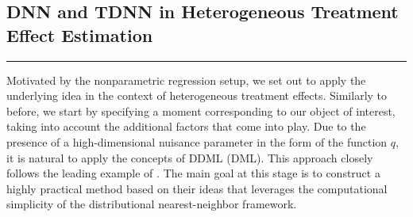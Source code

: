 \subsection{DNN and TDNN in Heterogeneous Treatment Effect Estimation}
\hrule
Motivated by the nonparametric regression setup, we set out to apply the underlying idea in the context of heterogeneous treatment effects.
Similarly to before, we start by specifying a moment corresponding to our object of interest, taking into account the additional factors that come into play.
Due to the presence of a high-dimensional nuisance parameter in the form of the function $q$, it is natural to apply the concepts of DDML (DML).
This approach closely follows the leading example of \citet{ritzwoller_simultaneous_2024}.
The main goal at this stage is to construct a highly practical method based on their ideas that leverages the computational simplicity of the distributional nearest-neighbor framework.\\


